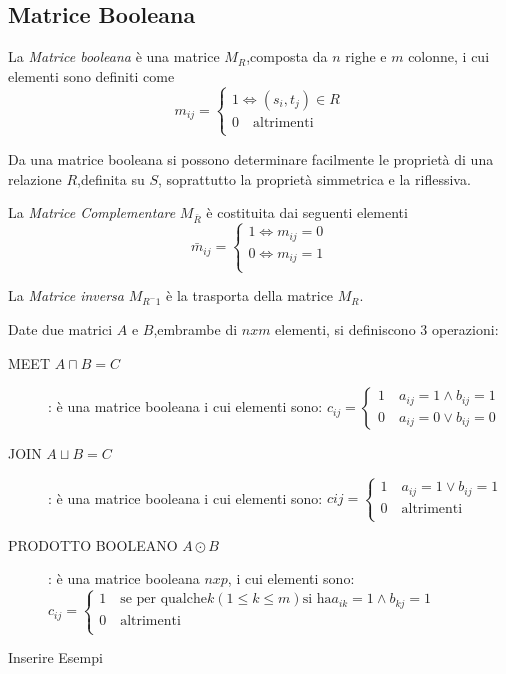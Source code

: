 \subsection{Matrice Booleana}
La \emph{Matrice booleana} è una matrice $M_R$,composta da $n$ righe e $m$ colonne,
i cui elementi sono definiti come
\begin{equation*}
    m_{ij} = \begin{cases} 1 \iff (s_i,t_j) \in R \\
                           0 \quad \text{altrimenti} \\
             \end{cases}
\end{equation*}


Da una matrice booleana si possono determinare facilmente le proprietà
di una relazione $R$,definita su $S$, soprattutto la proprietà simmetrica e la riflessiva.

La \emph{Matrice Complementare} $M_{\bar{R}}$ è costituita dai seguenti elementi
\begin{equation*}
    \bar{m}_{ij} = \begin{cases} 1 \iff m_{ij} = 0 \\
                                 0 \iff m_{ij} = 1 \\
                   \end{cases}
\end{equation*}

La \emph{Matrice inversa} $M_{R ^-1}$ è la trasporta della matrice $M_R$.

Date due matrici $A$ e $B$,embrambe di $n x m$ elementi, si definiscono 3 operazioni:
\begin{description}
    \item[MEET $A \sqcap B = C$]: è una matrice booleana i cui elementi sono:
$c_{ij} =  \begin{cases} 1 \quad a_{ij} = 1 \land b_{ij} = 1 \\ 0 \quad a_{ij} = 0 \lor b_{ij} = 0 \end{cases}$
    \item[JOIN $A \sqcup B = C$]: è una matrice booleana i cui elementi sono:
    $c{ij} = \begin{cases} 1 \quad a_{ij} = 1 \lor b_{ij} = 1 \\
                           0 \quad \text{altrimenti}\\ \end{cases}$
    \item[PRODOTTO BOOLEANO $A \odot B$]: è una matrice booleana $n x p$, i cui elementi sono:
    $c_{ij} = \begin{cases} 1 \quad \text{se per qualche} k(1 \leq k \leq m) \text{si ha} a_{ik} = 1 \land b_{kj} = 1\\
                            0 \quad \text{altrimenti} \\ \end{cases}$
\end{description}

Inserire Esempi


